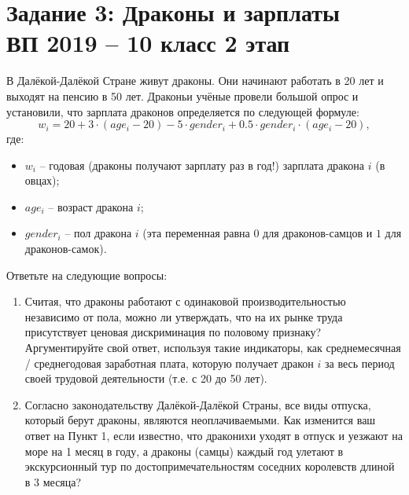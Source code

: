 \documentclass[10pt, a4paper]{extarticle}
\begin{document}
\section*{Задание 3: Драконы и зарплаты \\ {\small ВП 2019 – 10 класс 2 этап}}
В Далёкой-Далёкой Стране живут драконы. Они начинают работать в 20 лет и выходят на пенсию в 50 лет. Драконьи учёные провели большой опрос и установили, что зарплата драконов определяется по следующей формуле:
\[
w_i = 20 + 3\cdot(age_i - 20) - 5 \cdot gender_i + 0.5 \cdot gender_i\cdot(age_i - 20),
\]
где:
\begin{itemize}
	\item $w_i$ – годовая (драконы получают зарплату раз в год!) зарплата дракона $i$ (в овцах);
	\item $age_i$ – возраст дракона $i$;
	\item $gender_i$ – пол дракона $i$ (эта переменная равна $0$ для драконов-самцов и $1$ для драконов-самок).
\end{itemize}

Ответьте на следующие вопросы:
\begin{enumerate}
	\item Считая, что драконы работают с одинаковой производительностью независимо от пола, можно ли утверждать, что на их рынке труда присутствует ценовая дискриминация по половому признаку? Аргументируйте свой ответ, используя такие индикаторы, как среднемесячная / среднегодовая заработная плата, которую получает дракон $i$ за весь период своей трудовой деятельности (т.е. с 20 до 50 лет).
	\item Согласно законодательству Далёкой-Далёкой Страны, все виды отпуска, который берут драконы, являются неоплачиваемыми. Как изменится ваш ответ на Пункт 1, если известно, что драконихи уходят в отпуск и уезжают на море на 1 месяц в году, а драконы (самцы) каждый год улетают в экскурсионный тур по достопримечательностям соседних королевств длиной в 3 месяца?
\end{enumerate}
\end{document}
